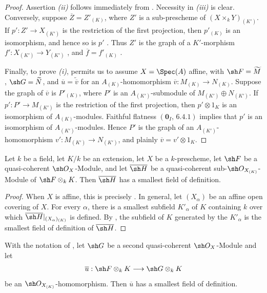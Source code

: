 \begin{proof}
Assertion \emph{(ii)} follows immediately from .
Necessity in \emph{(iii)} is clear.
Conversely, suppose
$\overline Z=Z'_{(K)}$, where $Z'$ is a sub-prescheme of
$(X\times_kY)_{(K')}$.
If $p':Z'\to X_{(K')}$ is the restriction of the first projection,
then $p'_{(K)}$ is an isomorphism, and hence so is $p'$
.
Thus $Z'$ is the graph of a $K'$-morphism
$f':X_{(K')}\to Y_{(K')}$ , and
$\overline f=f'_{(K)}$ .

Finally, to prove \emph{(i)},  permits us to assume
$X=\Spec(A)$ affine, with $\sh F=\widetilde M$,
$\sh G=\widetilde N$, and
$\overline u=\widetilde{\overline v}$ for an
$A_{(K)}$-homomorphism
$\overline v:M_{(K)}\to N_{(K)}$.
Suppose the graph of $\overline v$ is
$P'_{(K)}$, where $P'$ is an $A_{(K')}$-submodule of
$M_{(K')}\oplus N_{(K')}$.
If $p':P'\to M_{(K')}$ is the restriction of the first projection,
then $p'\otimes1_K$ is an isomorphism of $A_{(K)}$-modules.
Faithful flatness $(\mathbf 0_I,\,6.4.1)$ implies that $p'$ is an
isomorphism of $A_{(K')}$-modules.
Hence $P'$ is the graph of an $A_{(K')}$-homomorphism
$v':M_{(K')}\to N_{(K')}$, and plainly
$\overline v=v'\otimes1_K$.
\end{proof}

\begin{proposition}[4.8.9]
\label{IV.4.8.9}
Let $k$ be a field, let $K/k$ be an extension, let $X$ be a
$k$-prescheme, let $\sh F$ be a quasi-coherent $\sh O_X$-Module, and
let $\overline{\sh H}$ be a quasi-coherent
sub-$\sh O_{X_{(K)}}$-Module of
$\sh F\otimes_kK$.
Then $\overline{\sh H}$ has a smallest field of definition.
\end{proposition}

\begin{proof}
When $X$ is affine, this is precisely .
In general, let $(X_\alpha)$ be an affine open covering of $X$.
For every $\alpha$, there is a smallest subfield $K'_\alpha$ of $K$
containing $k$ over which
$\overline{\sh H}|_{(X_\alpha)_{(K)}}$ is defined.
By , the subfield of $K$ generated by the
$K'_\alpha$ is the smallest field of definition of $\overline{\sh H}$.
\end{proof}

\begin{corollary}[4.8.10]
\label{IV.4.8.10}
With the notation of , let $\sh G$ be a second
quasi-coherent $\sh O_X$-Module and let
\[
\overline u:\sh F\otimes_kK\longrightarrow\sh G\otimes_kK
\]
be an $\sh O_{X_{(K)}}$-homomorphism.
Then $\overline u$ has a smallest field of definition.
\end{corollary}


